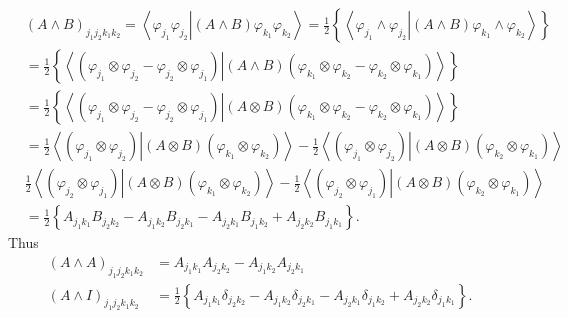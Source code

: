 \documentclass[aps,preprint]{revtex4}%
\begin{document}
\begin{align}
&  \left(  A\wedge B\right)  _{j_{1}j_{2}k_{1}k_{2}}=\left\langle
\varphi_{j_{1}}\varphi_{j_{2}}\left\vert \left(  A\wedge B\right)
\varphi_{k_{1}}\varphi_{k_{2}}\right.  \right\rangle =\frac{1}{2}\left\{
\left\langle \varphi_{j_{1}}\wedge\varphi_{j_{2}}\left\vert \left(  A\wedge
B\right)  \varphi_{k_{1}}\wedge\varphi_{k_{2}}\right.  \right\rangle \right\}
\nonumber\\
&  =\frac{1}{2}\left\{  \left\langle \left(  \varphi_{j_{1}}\otimes
\varphi_{j_{2}}-\varphi_{j_{2}}\otimes\varphi_{j_{1}}\right)  \left\vert
\left(  A\wedge B\right)  \left(  \varphi_{k_{1}}\otimes\varphi_{k_{2}%
}-\varphi_{k_{2}}\otimes\varphi_{k_{1}}\right)  \right.  \right\rangle
\right\} \nonumber\\
&  =\frac{1}{2}\left\{  \left\langle \left(  \varphi_{j_{1}}\otimes
\varphi_{j_{2}}-\varphi_{j_{2}}\otimes\varphi_{j_{1}}\right)  \left\vert
\left(  A\otimes B\right)  \left(  \varphi_{k_{1}}\otimes\varphi_{k_{2}%
}-\varphi_{k_{2}}\otimes\varphi_{k_{1}}\right)  \right.  \right\rangle
\right\} \nonumber\\
&  =\frac{1}{2}\left\langle \left(  \varphi_{j_{1}}\otimes\varphi_{j_{2}%
}\right)  \left\vert \left(  A\otimes B\right)  \left(  \varphi_{k_{1}}%
\otimes\varphi_{k_{2}}\right)  \right.  \right\rangle -\frac{1}{2}\left\langle
\left(  \varphi_{j_{1}}\otimes\varphi_{j_{2}}\right)  \left\vert \left(
A\otimes B\right)  \left(  \varphi_{k_{2}}\otimes\varphi_{k_{1}}\right)
\right.  \right\rangle \nonumber\\
&  \frac{1}{2}\left\langle \left(  \varphi_{j_{2}}\otimes\varphi_{j_{1}%
}\right)  \left\vert \left(  A\otimes B\right)  \left(  \varphi_{k_{1}}%
\otimes\varphi_{k_{2}}\right)  \right.  \right\rangle -\frac{1}{2}\left\langle
\left(  \varphi_{j_{2}}\otimes\varphi_{j_{1}}\right)  \left\vert \left(
A\otimes B\right)  \left(  \varphi_{k_{2}}\otimes\varphi_{k_{1}}\right)
\right.  \right\rangle \nonumber\\
&  =\frac{1}{2}\left\{  A_{j_{1}k_{1}}B_{j_{2}k_{2}}-A_{j_{1}k_{2}}%
B_{j_{2}k_{1}}-A_{j_{2}k_{1}}B_{j_{1}k_{2}}+A_{j_{2}k_{2}}B_{j_{1}k_{1}%
}\right\}  .
\end{align}
Thus%
\begin{align}
\left(  A\wedge A\right)  _{j_{1}j_{2}k_{1}k_{2}}  &  =A_{j_{1}k_{1}}%
A_{j_{2}k_{2}}-A_{j_{1}k_{2}}A_{j_{2}k_{1}}\nonumber\\
\left(  A\wedge I\right)  _{j_{1}j_{2}k_{1}k_{2}}  &  =\frac{1}{2}\left\{
A_{j_{1}k_{1}}\delta_{j_{2}k_{2}}-A_{j_{1}k_{2}}\delta_{j_{2}k_{1}}%
-A_{j_{2}k_{1}}\delta_{j_{1}k_{2}}+A_{j_{2}k_{2}}\delta_{j_{1}k_{1}}\right\}
.
\end{align}
\end{document}
